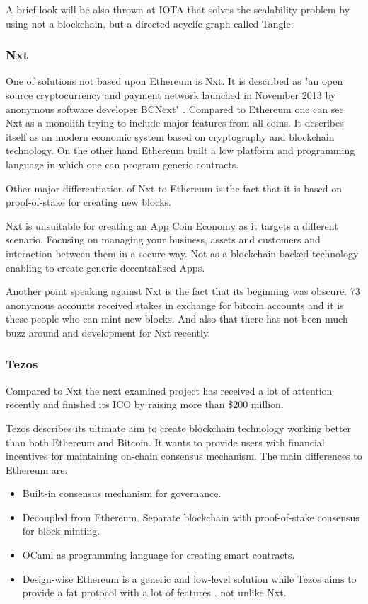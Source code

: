A brief look will be also thrown at IOTA that solves the scalability problem by using not a blockchain, but a directed acyclic graph called Tangle.

\subsubsection{Nxt}
One of solutions not based upon Ethereum is Nxt. It is described as "an open source cryptocurrency and payment network launched in November 2013 by anonymous software developer BCNext" \cite{Nxt}. Compared to Ethereum one can see Nxt as a monolith trying to include major features from all coins. It describes itself as an modern economic system based on cryptography and blockchain technology. On the other hand Ethereum built a low platform and programming language in which one can program generic contracts.

Other major differentiation of Nxt to Ethereum is the fact that it is based on proof-of-stake for creating new blocks.

Nxt is unsuitable for creating an App Coin Economy as it targets a different scenario. Focusing on managing your business, assets and customers and interaction between them in a secure way. Not as a blockchain backed technology enabling to create generic decentralised Apps.

Another point speaking against Nxt is the fact that its beginning was obscure. 73 anonymous accounts received stakes in exchange for bitcoin accounts and it is these people who can mint new blocks. And also that there has not been much buzz around and development for Nxt recently.

\subsubsection{Tezos}
Compared to Nxt the next examined project has received a lot of attention recently and finished its ICO by raising more than \$200 million.

Tezos describes its ultimate aim to create blockchain technology working better than both Ethereum and Bitcoin. It wants to provide users with financial incentives for maintaining on-chain consensus mechanism. The main differences to Ethereum are:

\begin{itemize}
    \item Built-in consensus mechanism for governance.
    \item Decoupled from Ethereum. Separate blockchain with proof-of-stake consensus for block minting.
    \item OCaml as programming language for creating smart contracts.
    \item Design-wise Ethereum is a generic and low-level solution while Tezos aims to provide a fat protocol with a lot of features \cite{TezosEth}, not unlike Nxt.
\end{itemize}

